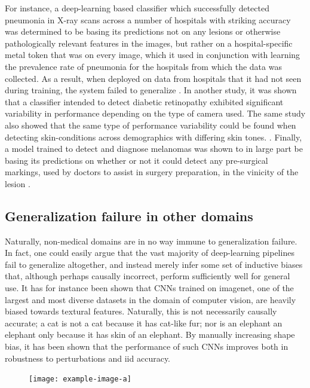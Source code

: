	For instance, a deep-learning based classifier which successfully detected pneumonia in X-ray scans across a number of hospitals with striking accuracy was determined to be basing its predictions not on any lesions or otherwise pathologically relevant features in the images, but rather on a hospital-specific metal token that was on every image, which it used in conjunction with learning the prevalence rate of pneumonia for the hospitals from which the data was collected. As a result, when deployed on data from hospitals that it had not seen during training, the system failed to generalize \cite{pneumonia}. In another study, it was shown that a classifier intended to detect diabetic retinopathy exhibited significant variability in performance depending on the type of camera used. The same study also showed that the same type of performance variability could be found when detecting skin-conditions across demographics with differing skin tones. \cite{damour2020underspecification}. Finally, a model trained to detect and diagnose melanomas  was shown to in large part be basing its predictions on whether or not it could detect any pre-surgical markings, used by doctors to assist in surgery preparation, in the vinicity of the lesion \cite{skin_shortcut}.  
	 
	\subsection{Generalization failure in other domains}
	Naturally, non-medical domains are in no way immune to generalization failure. In fact, one could easily argue that the vast majority of deep-learning pipelines fail to generalize altogether, and instead merely infer some set of inductive biases that, although perhaps causally incorrect, perform sufficiently well for general use. It has for instance been shown that CNNs trained on imagenet, one of the largest and most diverse datasets in the domain of computer vision, are heavily biased towards textural features\cite{texturebias}. Naturally, this is not necessarily causally accurate; a cat is not a cat because it has cat-like fur; nor is an elephant an elephant only because it has skin of an elephant. By manually increasing shape bias, it has been shown that the performance of such CNNs improves both in robustness to perturbations and iid accuracy.

	\begin{figure}[H]
		\texttt{[image: example-image-a]}
		\caption{}
		\label{cat_elephant}
	\end{figure}
	
